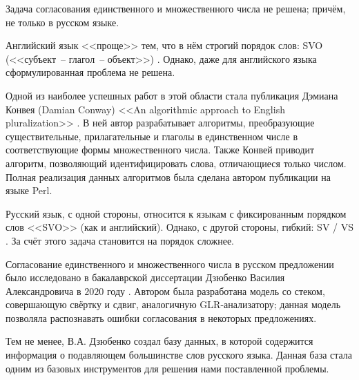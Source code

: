 \documentclass[main]{subfiles}
\begin{document}
Задача согласования единственного и множественного числа не решена; причём, не только в русском языке.

Английский язык <<проще>> тем, что в нём строгий порядок слов: SVO (<<субъект~-- глагол~-- объект>>) \cite{synt}. Однако, даже для английского языка сформулированная проблема не решена. 

Одной из наиболее успешных работ в этой области стала публикация Дэмиана Конвея (Damian Conway) <<An algorithmic approach to English pluralization>> \cite{plur}. В ней автор разрабатывает алгоритмы, преобразующие существительные, прилагательные и глаголы в единственном числе в соответствующие формы множественного числа. Также Конвей приводит алгоритм, позволяющий идентифицировать слова, отличающиеся только числом. Полная реализация данных алгоритмов была сделана автором публикации на языке Perl.

Русский язык, с одной стороны, относится к языкам с фиксированным порядком слов <<SVO>> (как и английский). Однако, с другой стороны, гибкий: SV / VS \cite{ox}. За счёт этого задача становится на порядок сложнее. 

Согласование единственного и множественного числа в русском предложении было исследовано в бакалаврской диссертации Дзюбенко Василия Александровича в $2020$ году \cite{dz}. Автором была разработана модель со стеком, совершающую свёртку и сдвиг, аналогичную GLR-анализатору; данная модель позволяла распознавать ошибки согласования в некоторых предложениях.

Тем не менее, В.А. Дзюбенко создал базу данных, в которой содержится информация о подавляющем большинстве слов русского языка. Данная база стала одним из базовых инструментов для решения нами поставленной проблемы.
\end{document}
